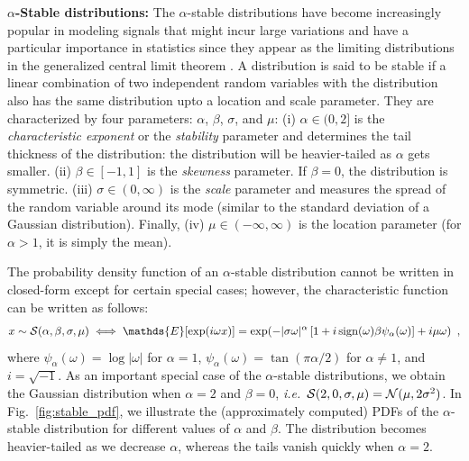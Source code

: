 

\textbf{$\alpha$-Stable distributions:} 
The $\alpha$-stable distributions have become increasingly popular in modeling signals that might incur large variations \citep{kuruoglu1999signal, mandelbrot2013fractals,simsekli2015alpha,wang2016delving,leglaive:hal-01416366} and have a particular importance in statistics since they appear as the limiting distributions in the generalized central limit theorem \citep{samorodnitsky1994stable}. A distribution is said to be stable if a linear combination of two independent random variables with the distribution also has the same distribution upto a location and scale parameter. They are characterized by four parameters: $\alpha$, $\beta$, $\sigma$, and $\mu$:
%
(i) $\alpha \in (0,2]$ is the \emph{characteristic exponent} or the \emph{stability} parameter and determines the tail thickness of the distribution: the distribution will be heavier-tailed as $\alpha$ gets smaller. 
(ii) $\beta \in [-1 ,1]$ is the \emph{skewness} parameter.
If $\beta = 0$, the distribution is symmetric.
(iii) $\sigma \in (0,\infty)$ is the \emph{scale} parameter and measures the spread of the random variable around its mode (similar to the standard deviation of a Gaussian distribution). Finally, (iv) $\mu \in (-\infty, \infty)$ is the location parameter (for $\alpha > 1$, it is simply the mean). 

The probability density function of an $\alpha$-stable distribution cannot be written in closed-form except for certain special cases; however, the characteristic function  can be written as follows:
\begin{align*}
x \sim {\cal S}(\alpha,\beta,\sigma,\mu) \iff \mathds{E}[\exp( i \omega x)]  = \exp(-|\sigma \omega|^\alpha \left[1+ i \sign(\omega)\beta \psi_\alpha(\omega)  \right] + i \mu \omega ) \enspace ,
\end{align*}
where $\psi_\alpha(\omega) = \log |\omega| $ for $\alpha =1$, $\psi_\alpha(\omega) = \tan(\pi \alpha/2)$ for $\alpha \neq 1$, and $i = \sqrt{-1}$. 
%
As an important special case of the $\alpha$-stable distributions, we obtain the Gaussian distribution when $\alpha = 2$ and $\beta =0$, \textit{i.e.}\ ${\cal S}(2,0,\sigma,\mu) = {\cal N}(\mu,2 \sigma^2)$. 
%
In Fig.~\ref{fig:stable_pdf}, we illustrate the (approximately computed) \acp{PDF} of the $\alpha$-stable distribution for different values of $\alpha$ and $\beta$. The distribution becomes heavier-tailed as we decrease $\alpha$, whereas the tails vanish quickly when $\alpha=2$. 


